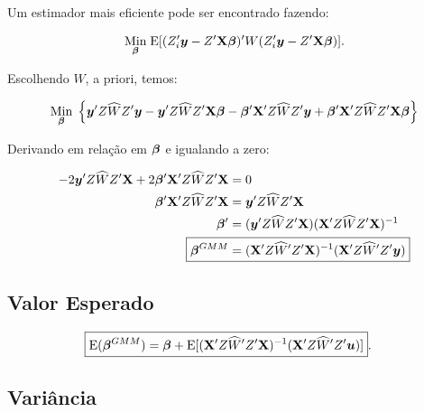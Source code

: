 \documentclass[11pt, oneside, a4paper, article]{article}
\numberwithin{equation}{section}
\begin{document}
\begin{description}
Um estimador mais eficiente pode ser encontrado fazendo:

\vspace{-1 em}
\begin{align*}
\underset{\boldsymbol{\beta}}{\text{Min}} \;
\text{E}[ ( Z_{i}' \boldsymbol{y} - Z' \mathbf{X} \boldsymbol{\beta} )' W ( Z_{i}' \boldsymbol{y} - Z' \mathbf{X} \boldsymbol{\beta} ) ].
\end{align*}

\noindent
Escolhendo $\widehat{W}$, a priori, temos:

\vspace{-1 em}
\begin{align*}
\underset{\boldsymbol{\beta}}{\text{Min}} \;
\left\{ 
\boldsymbol{y}' Z \widehat{W} Z' \boldsymbol{y}
-
\boldsymbol{y}' Z \widehat{W} Z' \mathbf{X} \boldsymbol{\beta}
-
\boldsymbol{\beta}' \mathbf{X}'  Z \widehat{W} Z' \boldsymbol{y}
+
\boldsymbol{\beta}' \mathbf{X}'  Z \widehat{W} Z' \mathbf{X} \boldsymbol{\beta}
\right\}
\end{align*}

Derivando em relação em $\boldsymbol{\beta}$ e igualando a zero:

\vspace{-1 em}
\begin{align*}
-2 \yvec' Z \widehat{W} Z' \Xmat + 2 \betavec'\Xmat' Z \widehat{W} Z' \Xmat &= 0
\\
\betavec'\Xmat' Z \widehat{W} Z' \Xmat &= \yvec' Z \widehat{W} Z' \Xmat 
\\
\betavec' &= ( \yvec' Z \widehat{W} Z' \Xmat ) ( \Xmat' Z \widehat{W} Z' \Xmat )^{-1}
\\
\Aboxed{
\betavec^{GMM} &= ( \Xmat' Z \widehat{W}' Z' \Xmat )^{-1} ( \Xmat' Z \widehat{W}' Z' \yvec ) }
\end{align*}

\subsection{Valor Esperado} 

\vspace{-1 em}
\begin{align*}
\Aboxed{
\E( \betavec^{GMM} ) &=
\betavec +
\E[ ( \Xmat' Z \widehat{W}' Z' \Xmat )^{-1} ( \Xmat' Z \widehat{W}' Z' \uvec ) ] }.
\end{align*}

\subsection{Variância} 


\end{description}
\end{document}
